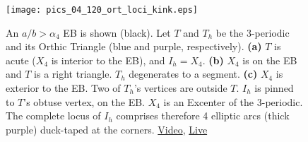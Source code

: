 \begin{figure}
    \centering
    \texttt{[image: pics\_04\_120\_ort\_loci\_kink.eps]}
    \caption{An $a/b>\alpha_4$ EB is shown (black). Let $T$ and $T_h$ be the 3-periodic and its Orthic Triangle (blue and purple, respectively). \textbf{(a)} $T$ is acute ($X_4$ is interior to the EB), and $I_h=X_4$. \textbf{(b)} $X_4$ is on the EB and $T$ is a right triangle. $T_h$ degenerates to a segment. \textbf{(c)} $X_4$ is exterior to the EB. Two of $T_h$'s vertices are outside $T$. $I_h$ is pinned to $T$'s obtuse vertex, on the EB. $X_4$ is an Excenter of the 3-periodic. The complete locus of $I_h$ comprises therefore 4 elliptic arcs (thick purple) duck-taped at the corners. \href{https://youtu.be/3qJnwpFkUFQ}{Video}, \href{https://bit.ly/33TVjit}{Live}}
    \label{fig:orthic_incenter_locus}
\end{figure}